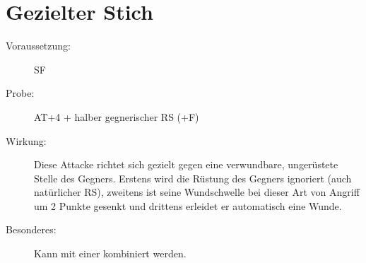 \section{Gezielter Stich}
\label{aktion.gezielter_stich}
\begin{description}
    \item[Voraussetzung:]
        SF 
    \item[Probe:]
        AT+4 + halber gegnerischer RS (+F)
    \item[Wirkung:]
        Diese Attacke richtet sich gezielt gegen eine verwundbare, ungerüstete Stelle des Gegners.
        Erstens wird die Rüstung des Gegners ignoriert (auch natürlicher RS), zweitens ist seine Wundschwelle bei dieser Art von Angriff um 2 Punkte gesenkt und drittens erleidet er automatisch eine Wunde.
    \item[Besonderes:]
        Kann mit einer  kombiniert werden.
\end{description}
